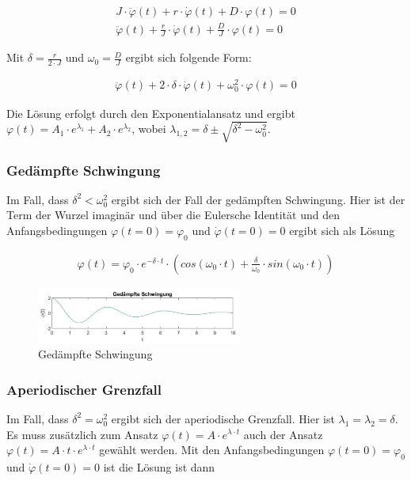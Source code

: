 \documentclass{article}
\begin{document}
\begin{gather} \label{eq:ged_schw_diff}
    J \cdot \ddot \varphi(t) + r \cdot \dot \varphi(t) + D \cdot \varphi(t) = 0 \\
    \ddot \varphi(t) + \frac{r}{J} \cdot \dot \varphi(t) + \frac{D}{J} \cdot \varphi(t) = 0
\end{gather}

\noindent Mit $\delta = \frac{r}{2 \cdot J}$ und $\omega_0 = \frac{D}{J}$ ergibt sich folgende Form:

\begin{gather} \label{eq:ged_schw_delta_omega}
    \ddot \varphi(t) + 2 \cdot \delta \cdot \dot \varphi(t) + \omega_0^2 \cdot \varphi(t) = 0
\end{gather}

Die Lösung erfolgt durch den Exponentialansatz und ergibt $\varphi(t) = A_1 \cdot e^{\lambda_1} + A_2 \cdot e^{\lambda_2}$, wobei
$\lambda_{1,2} = \delta \pm \sqrt{\delta^2 - \omega_0^2}$.

\subsubsection{Gedämpfte Schwingung}
Im Fall, dass $\delta^2 < \omega_0^2$ ergibt sich der Fall der gedämpften Schwingung. Hier ist der Term der Wurzel imaginär und
über die Eulersche Identität und den Anfangsbedingungen $\varphi(t = 0) = \varphi_0$ und $\dot \varphi(t = 0) = 0$
ergibt sich als Lösung 

\begin{gather} \label{eq:schwingung_partikulaere_loesung}
    \varphi(t) = \varphi_0 \cdot e^{-\delta \cdot t} \cdot (cos(\omega_0 \cdot t) + \frac{\delta}{\omega_0} \cdot sin(\omega_0 \cdot t))
\end{gather}

\begin{figure}[H]
    \centering
    \includegraphics[width=0.6\textwidth]{bilder/schwingung_gedampft.png}
    \caption{Gedämpfte Schwingung}
    \label{fig:schw_ged}
\end{figure}

\subsubsection{Aperiodischer Grenzfall}
Im Fall, dass $\delta^2 = \omega_0^2$ ergibt sich der aperiodische Grenzfall. Hier ist $\lambda_1 = \lambda_2 = \delta$.
Es muss zusätzlich zum Ansatz $\varphi(t) = A \cdot e^{\lambda \cdot t}$ auch der Ansatz $\varphi(t) = A \cdot t \cdot e^{\lambda \cdot t}$
gewählt werden. Mit den Anfangsbedingungen $\varphi(t = 0) = \varphi_0$ und $\dot \varphi(t = 0) = 0$ ist die Lösung ist dann
\end{document}
